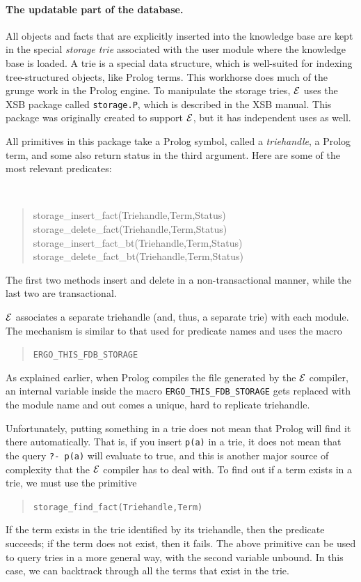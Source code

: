 \documentclass[11pt]{article}
\newcommand{\ERGO}{\mbox{\ensuremath{\cal{E}}\smaller{{\sc{RGO}}}}\xspace}
\newcommand{\FLSYSTEM}{\ERGO}
\begin{document}
\paragraph{The updatable part of the database.}
All objects and facts that are explicitly inserted into the knowledge
base are kept
in the special \emph{storage trie} associated with the user module where the
knowledge base is loaded. A trie is a special data structure, which is
well-suited for indexing tree-structured objects, like Prolog terms. This
workhorse does much of the grunge work in the Prolog engine. To manipulate the
storage tries, \FLSYSTEM uses the XSB package called {\tt storage.P}, which is
described in the XSB manual. This package was originally created to support
\FLSYSTEM, but it has independent uses as well.

All primitives in this package take a Prolog symbol, called a
\emph{triehandle}, a Prolog term, and some also return status in the third
argument. Here are some of the most relevant predicates:
{\tt
\begin{quote}
  storage\_insert\_fact(Triehandle,Term,Status)\\
  storage\_delete\_fact(Triehandle,Term,Status)\\
  storage\_insert\_fact\_bt(Triehandle,Term,Status)\\
  storage\_delete\_fact\_bt(Triehandle,Term,Status)
\end{quote}
}
\noindent
The first two methods insert and delete in a non-transactional manner,
while the last two are transactional.

\FLSYSTEM associates a separate triehandle (and, thus, a separate trie) with
each module. The mechanism is similar to that used for predicate names and
uses the macro
\begin{quote}
 \tt ERGO\_THIS\_FDB\_STORAGE
\end{quote}
As explained earlier, when Prolog compiles the file generated by the
\FLSYSTEM compiler, an internal variable inside
the macro {\tt ERGO\_THIS\_FDB\_STORAGE} gets replaced with
the module name and out comes a unique, hard to replicate triehandle.

Unfortunately, putting something in a trie does not mean that Prolog will find
it there automatically. That is, if you insert {\tt p(a)} in a trie, it
does not mean that the query {\tt ?- p(a)} will evaluate to true, and this
is another major source of complexity that the \FLSYSTEM compiler has to deal
with. To find out if a term exists in a trie, we must use the primitive
\begin{quote}
 \tt storage\_find\_fact(Triehandle,Term)  
\end{quote}
If the term exists in the trie identified by its triehandle, then the
predicate succeeds; if the term does not exist, then it fails. The above
primitive can be used to query tries in a more general way, with the second
variable unbound. In this case, we can backtrack through all the terms that
exist in the trie.
\end{document}
